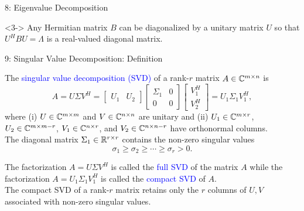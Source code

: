 \documentclass[10pt,english,aspectratio=169]{beamer}
\begin{document}
\begin{frame}{8: Eigenvalue Decomposition}
\begin{theorem}<3->
Any Hermitian matrix $B$ can be diagonalized by a unitary matrix $U$ so that $U^H B U = \Lambda$ is a real-valued diagonal matrix.
\end{theorem}

\vspace{-1mm}



\end{frame}


\begin{frame}{9: Singular Value Decomposition: Definition}

\begin{definition}
The \textcolor{blue}{singular value decomposition (SVD)} of a rank-$r$ matrix $A \in \mathbb{C}^{m \times n}$ is \vspace{-1mm}
\begin{equation*}
A = U \Sigma V^H
= \left[ \begin{array}{cc} U_1 & U_2 \end{array} \right]
\left[ \begin{array}{cc} \Sigma_1 & 0 \\ 0 & 0 \end{array} \right]
\left[ \begin{array}{c} V_1^H \\ V_2^H \end{array} \right]
= U_1 \Sigma_1 V_1^H,
\end{equation*}
where (i) $U \in \mathbb{C}^{m \times m}$ and $V \in \mathbb{C}^{n \times n}$ are unitary and (ii) $U_1 \in \mathbb{C}^{m \times r}$, $U_2 \in \mathbb{C}^{m \times m-r}$, $V_1 \in \mathbb{C}^{n \times r}$, and $V_2 \in \mathbb{C}^{n \times n-r}$ have orthonormal columns.
\\ The diagonal matrix $\Sigma_1 \in \mathbb{R}^{r \times r}$ contains the non-zero singular values \vspace{-2mm}
\[ \sigma_1 \geq \sigma_2 \geq \cdots \geq \sigma_r > 0. \]
\end{definition}

\vspace{1mm}

The factorization $A = U \Sigma V^H$ is called the \textcolor{blue}{full SVD} of the matrix $A$ while the factorization $A = U_1 \Sigma_1 V_1^H$ is called the \textcolor{blue}{compact SVD} of $A$.
\\[1mm] The compact SVD of a rank-$r$ matrix retains only the $r$ columns of $U,V$ associated with non-zero singular values.

\end{frame}
\end{document}
